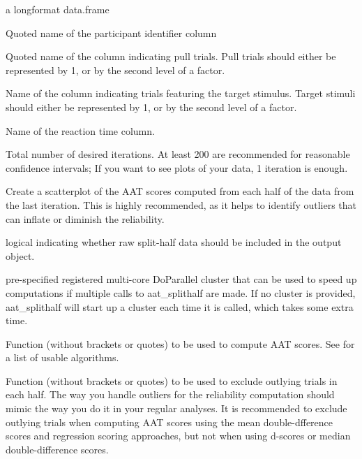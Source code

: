 \documentclass[a4paper]{book}
\begin{document}
\begin{Arguments}
\begin{ldescription}
\item[\code{ds}] a longformat data.frame

\item[\code{subjvar}] Quoted name of the participant identifier column

\item[\code{pullvar}] Quoted name of the column indicating pull trials.
Pull trials should either be represented by 1, or by the second level of a factor.

\item[\code{targetvar}] Name of the column indicating trials featuring the target stimulus.
Target stimuli should either be represented by 1, or by the second level of a factor.

\item[\code{rtvar}] Name of the reaction time column.

\item[\code{iters}] Total number of desired iterations. At least 200 are recommended for reasonable confidence intervals;
If you want to see plots of your data, 1 iteration is enough.

\item[\code{plot}] Create a scatterplot of the AAT scores computed from each half of the data from the last iteration.
This is highly recommended, as it helps to identify outliers that can inflate or diminish the reliability.

\item[\code{include.raw}] logical indicating whether raw split-half data should be included in the output object.

\item[\code{cluster}] pre-specified registered multi-core DoParallel cluster that can be used to speed up computations if multiple calls to aat\_splithalf are made.
If no cluster is provided, aat\_splithalf will start up a cluster each time it is called, which takes some extra time.

\item[\code{algorithm}] Function (without brackets or quotes) to be used to compute AAT scores. See  for a list of usable algorithms.

\item[\code{trialdropfunc}] Function (without brackets or quotes) to be used to exclude outlying trials in each half.
The way you handle outliers for the reliability computation should mimic the way you do it in your regular analyses.
It is recommended to exclude outlying trials when computing AAT scores using the mean double-dfference scores and regression scoring approaches,
but not when using d-scores or median double-difference scores.
\begin{itemize}


\end{itemize}
\end{ldescription}
\end{Arguments}
\end{document}
